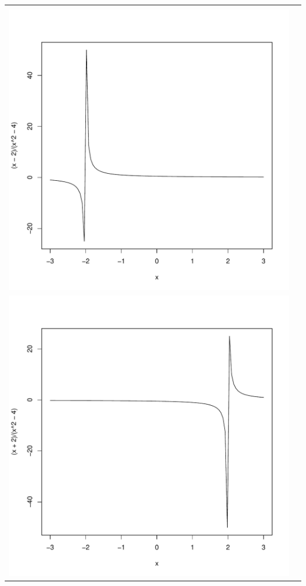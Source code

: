 \documentclass[12pt,b5paper]{ltjsarticle}
\begin{document}
\begin{tabular}{c|c}
\begin{minipage}{200pt}
 \end{minipage}\\ \hline
 \begin{minipage}{200pt}
  $a=-2$\\
  \includegraphics[scale=.35]{m2.pdf}
 \end{minipage} &
 \begin{minipage}{200pt}
  $a=2$\\
  \includegraphics[scale=.35]{p2.pdf}

\end{minipage}
\end{tabular}
\end{document}
